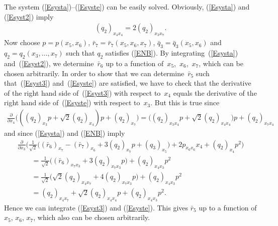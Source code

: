 \documentclass[pdftex]{sigma}
\numberwithin{equation}{section}
\begin{document}
\begin{Remark} \label{34}The system (\ref{Esysta})--(\ref{Esyste}) can be easily solved. Obviously, (\ref{Esysta}) and (\ref{Esyst2}) imply
\begin{gather}
(q_2)_{x_4 x_4} =2 (q_2)_{x_3 x_7}. \label{ENB}
\end{gather}
Now choose $p=p(x_5,x_6)$, $\bar r_7=\bar r_7(x_5,x_6,x_7)$, $\bar q_3=\bar q_3(x_5,x_6)$ and $q_2=q_2(x_3,\dots,x_7)$ such that $q_2$ satisfies (\ref{ENB}). By integrating~(\ref{Esysta}) and~(\ref{Esyst2}), we determine~$\bar r_6$ up to a function of~$x_5$,~$x_6$,~$x_7$, which can be chosen arbitrarily. In order to show that we can determine~$\bar r_5$ such that~(\ref{Esyst3}) and~(\ref{Esyste}) are satisfied, we have to check that the derivative of the right hand side of~(\ref{Esyst3}) with respect to~$x_4$ equals the derivative of the right hand side of~(\ref{Esyste}) with respect to~$x_3$. But this is true since
\begin{gather*} \frac{\partial}{\partial x_4} \big(((q_2)_{x_3}p+ {\sqrt2}(q_2)_{x_4})p+ (q_2)_{x_7}\big)=\big((q_2)_{x_3x_4}p+ {\sqrt2}(q_2)_{x_4x_4}\big)p+ (q_2)_{x_7x_4}\end{gather*}
and since (\ref{Esysta}) and (\ref{ENB}) imply
\begin{gather*}
 \frac{\partial}{\partial x_3}\big(\tfrac 1{\sqrt2} \big((\bar r_6)_{x_7} - (\bar r_7)_{x_6} +3 (q_2)_{x_7}p +(q_3)_{x_5}\big) +2p_{x_6 x_6} x_4 +(q_2)_{x_4} p^2\big) \\
 \qquad{} = \tfrac 1{\sqrt2}\big((\bar r_6)_{x_7x_3} +3 (q_2)_{x_7x_3}p\big) +(q_2)_{x_4x_3} p^2\\
\qquad{} = \tfrac 1{\sqrt2}\big(\sqrt2(q_2)_{x_4x_7} +4 (q_2)_{x_7x_3}p\big) +(q_2)_{x_4x_3} p^2\\
\qquad{} = (q_2)_{x_4x_7} +\sqrt2 (q_2)_{x_4x_4}p +(q_2)_{x_4x_3} p^2.
\end{gather*}
Hence we can integrate (\ref{Esyst3}) and (\ref{Esyste}). This gives $\bar r_5$ up to a function of $x_5$, $x_6$, $x_7$, which also can be chosen arbitrarily.
\end{Remark}
\end{document}

